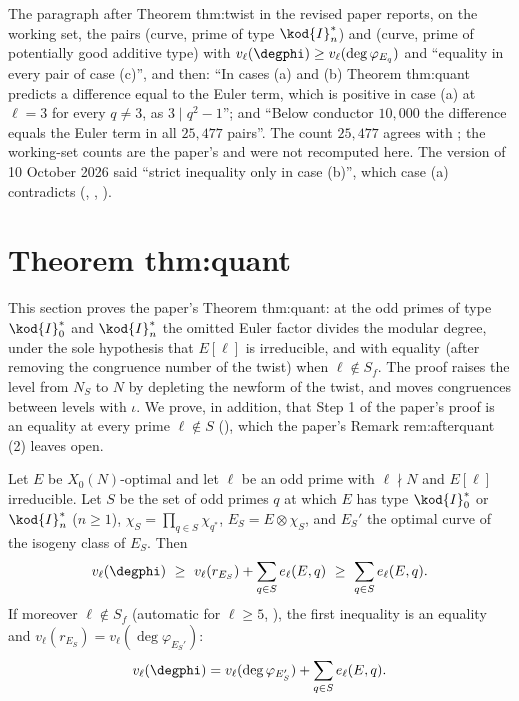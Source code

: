 \begin{paperlink}
The paragraph after Theorem thm:twist in the revised paper reports, on the working set, the pairs (curve, prime of type $\kod{I}_n^*$) and (curve, prime of potentially good additive type) with
$v_\ell(\degphi)\ge v_\ell(\deg\varphi_{E_q})$ and ``equality in every pair of case (c)'', and then: ``In cases (a) and (b) Theorem thm:quant predicts a difference equal to the Euler term, which is
positive in case (a) at $\ell=3$ for every $q\ne3$, as $3\mid q^2-1$''; and ``Below conductor $10{,}000$ the difference equals the Euler term in all $25{,}477$ pairs''. The count $25{,}477$ agrees with
; the working-set counts are the paper's and were not recomputed here. The version of 10 October 2026 said ``strict inequality only in case (b)'', which
case (a) contradicts (, , ).
\end{paperlink}

\section{Theorem thm:quant}\label{sec:congruence:quant}

This section proves the paper's Theorem thm:quant: at the odd primes of type $\kod{I}_0^*$ and $\kod{I}_n^*$ the omitted Euler factor divides the modular degree, under the sole
hypothesis that $E[\ell]$ is irreducible, and with equality (after removing the congruence number of the twist) when $\ell\notin S_f$. The proof raises the level from $N_S$ to $N$ by
depleting the newform of the twist, and moves congruences between levels with $\iota$. We prove, in addition, that Step 1 of the paper's proof is an equality at every prime $\ell\notin S$
(), which the paper's Remark rem:afterquant (2) leaves open.

\begin{theorem}\label{thm:congruence:quant}
Let $E$ be $X_0(N)$-optimal and let $\ell$ be an odd prime with $\ell\nmid N$ and $E[\ell]$ irreducible. Let $S$ be the set of odd primes $q$ at which $E$ has type $\kod{I}_0^*$ or $\kod{I}_n^*$ ($n\ge1$), $\chi_S=\prod_{q\in S}\chi_{q^*}$,
$E_S=E\otimes\chi_S$, and $E_S'$ the optimal curve of the isogeny class of $E_S$. Then
\begin{equation}\label{eq:congruence:quant}
v_\ell(\degphi)\ \ge\ v_\ell(r_{E_S})+\sum_{q\in S}e_\ell(E,q)\ \ge\ \sum_{q\in S}e_\ell(E,q).
\end{equation}
If moreover $\ell\notin S_f$ (automatic for $\ell\ge5$, ), the first inequality is an equality and $v_\ell(r_{E_S})=v_\ell(\deg\varphi_{E_S'})$:
\[
v_\ell(\degphi)=v_\ell(\deg\varphi_{E_S'})+\sum_{q\in S}e_\ell(E,q).
\]
\end{theorem}

